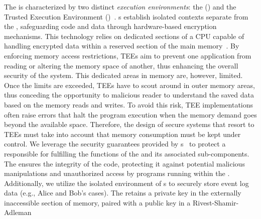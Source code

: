 The  is characterized by two distinct \textit{execution environments}: the  () and the Trusted Execution Environment ()~\citep{DBLP:conf/trustcom/SabtAB15}. s establish isolated contexts separate from the , safeguarding code and data through hardware-based encryption mechanisms. This technology relies on %
dedicated sections of a CPU capable of handling encrypted data within a reserved section of the main memory~\citep{costan2016intel}.
By enforcing memory access restrictions, TEEs aim to prevent one application from reading or altering the memory space of another, thus enhancing the overall security of the system.
This dedicated areas in memory are, however, limited.
Once the limits are exceeded, TEEs have to scout around in outer memory areas, thus conceding the opportunity to malicious reader to understand the saved data based on the memory reads and writes.
To avoid this risk, TEE implementations often raise errors that halt the program execution when the memory demand goes beyond the available space. %
Therefore, the design of secure systems that resort to TEEs must take into account that memory consumption must be kept under control.
We leverage the security guarantees provided by s~\citep{DBLP:journals/ieeesp/JauernigSS20} to protect a  responsible for fulfilling the functions of the  and its associated sub-components. %
The  ensures the integrity of the  code, protecting it against potential malicious manipulations and unauthorized access by programs running within the . Additionally, we utilize the isolated environment of s to securely store event log data (e.g., Alice and Bob's cases). %
The  retains a private key in the externally inaccessible section of memory, paired with a public key in a Rivest-Shamir-Adleman
